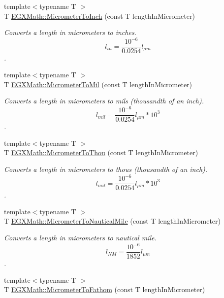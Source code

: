\begin{DoxyCompactItemize}
{\footnotesize template$<$typename T $>$ }\\T \mbox{\hyperlink{group___e_g_x_math-_conversions-_length_conversions-_s_i-_micrometer-_imperial_gad372acac36a8ca7f56b26858dd01546b}{E\+G\+X\+Math\+::\+Micrometer\+To\+Inch}} (const T length\+In\+Micrometer)
\begin{DoxyCompactList}\small\item\em Converts a length in micrometers to inches. \[ l_{in}= \frac{10^{-6}}{0.0254} l_{\mu m} \]. \end{DoxyCompactList}\item 
{\footnotesize template$<$typename T $>$ }\\T \mbox{\hyperlink{group___e_g_x_math-_conversions-_length_conversions-_s_i-_micrometer-_imperial_ga94d0f5a6ba598898a13e3a8837d7c681}{E\+G\+X\+Math\+::\+Micrometer\+To\+Mil}} (const T length\+In\+Micrometer)
\begin{DoxyCompactList}\small\item\em Converts a length in micrometers to mils (thousandth of an inch). \[ l_{mil}= \frac{10^{-6}}{0.0254} l_{\mu m} * 10^{3} \]. \end{DoxyCompactList}\item 
{\footnotesize template$<$typename T $>$ }\\T \mbox{\hyperlink{group___e_g_x_math-_conversions-_length_conversions-_s_i-_micrometer-_imperial_ga8a2cfa132c629695ff469f66e1ab5919}{E\+G\+X\+Math\+::\+Micrometer\+To\+Thou}} (const T length\+In\+Micrometer)
\begin{DoxyCompactList}\small\item\em Converts a length in micrometers to thous (thousandth of an inch). \[ l_{mil}= \frac{10^{-6}}{0.0254} l_{\mu m} * 10^{3} \]. \end{DoxyCompactList}\item 
{\footnotesize template$<$typename T $>$ }\\T \mbox{\hyperlink{group___e_g_x_math-_conversions-_length_conversions-_s_i-_micrometer-_nautical_ga43c5eb76a19baf316e06b38781369157}{E\+G\+X\+Math\+::\+Micrometer\+To\+Nautical\+Mile}} (const T length\+In\+Micrometer)
\begin{DoxyCompactList}\small\item\em Converts a length in micrometers to nautical mile. \[ l_{NM}= \frac{10^{-6}}{1852} l_{\mu m} \]. \end{DoxyCompactList}\item 
{\footnotesize template$<$typename T $>$ }\\T \mbox{\hyperlink{group___e_g_x_math-_conversions-_length_conversions-_s_i-_micrometer-_nautical_gad7205d8bf0d8735b12fc0b03c67cf0f7}{E\+G\+X\+Math\+::\+Micrometer\+To\+Fathom}} (const T length\+In\+Micrometer)

\end{DoxyCompactItemize}
